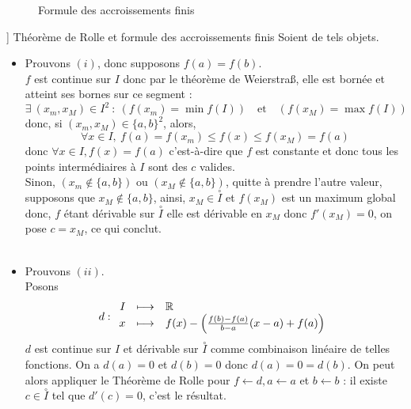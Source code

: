 \documentclass{article}
\renewenvironment{question_kholle}[2][ ]
{
	\subsection{\texorpdfstring{#2}{}}
	\notblank{#1}
	{
		\noindent #1
		\bigbreak
	}
	{}
	\begin{proof}
}
{
	\end{proof}
}
\begin{document}
\begin{question_kholle}
{\begin{enumerate}[label=($\roman*$)]
\begin{figure}[!h]
			      \caption{Formule des accroissements finis}
		      \end{figure}
	\end{enumerate}}
	]
	{Théorème de Rolle et formule des accroissements finis}
	Soient de tels objets. \\
	\begin{itemize}[label=$\bullet$]
		\item
		      Prouvons $(i)$, donc supposons $f(a) = f(b)$. \\
		      $f$ est continue sur $I$ donc par le théorème de Weierstraß, elle est bornée et atteint ses bornes sur ce segment :
		      \\
		      $$\exists \ (x_m, x_M)\in I^2 \ : \ (f(x_m) = \min f(I)) \quad\text{et}\quad (f(x_M) = \max f(I))$$
		      donc, si $(x_m, x_M)\in \{a,b\}^2$, alors,
		      $$\forall x \in I, \ f(a)=f(x_m) \leq f(x) \leq f(x_M)=f(a)$$
		      donc $\forall x \in I, f(x) = f(a)$ c'est-à-dire que $f$ est constante et donc tous les points intermédiaires à $I$ sont des $c$ valides.\\
		      Sinon, $(x_m \notin \{a,b\})$ ou $(x_M \notin \{a,b\}) $, quitte à prendre l'autre valeur, supposons que $x_M \notin \{a,b\}$, ainsi, $x_M \in \overset{\circ}{I}$ et $f(x_M)$ est un maximum global donc, $f$ étant dérivable sur $\overset{\circ}{I}$ elle est dérivable en $x_M$ donc $f'(x_M)=0$, on pose $c = x_M$, ce qui conclut. \\ \\
		\item Prouvons $(ii)$.\\
		      Posons $$d:\begin{array}{rcl}

				      I & \longmapsto & \R \\ x&\longmapsto& f(x) - \left( \frac{f(b)-f(a)}{b-a}(x-a) +f(a) \right)\end{array} $$
		      $d$ est continue sur $I$ et dérivable sur $\overset{\circ}{I}$ comme combinaison linéaire de telles fonctions. On a $d(a) = 0$ et $d(b) = 0$ donc $d(a) = 0 = d(b)$. On peut alors appliquer le Théorème de Rolle pour $f \gets d, a \gets a $ et $ b \gets b$ : il existe $c\in \overset{\circ}{I}$ tel que $d'(c) = 0$, c'est le résultat.
	\end{itemize}
\end{question_kholle}
\end{document}
